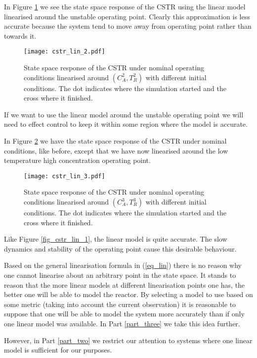 In Figure \ref{fig_cstr_lin_2} we see the state space response of the CSTR using the linear model linearised around the unstable operating point. Clearly this approximation is less accurate because the system tend to move away from operating point rather than towards it. 
\begin{figure}[H] 
\centering
\texttt{[image: cstr\_lin\_2.pdf]}
\caption{State space response of the CSTR under nominal operating conditions linearised around $(C_A^2,T_R^2)$ with different initial conditions. The dot indicates where the simulation started and the cross where it finished.}
\label{fig_cstr_lin_2}
\end{figure}
If we want to use the linear model around the unstable operating point we will need to effect control to keep it within some region where the model is accurate.

In Figure \ref{fig_cstr_lin_3} we have the state space response of the CSTR under nominal conditions, like before, except that we have now linearised around the low temperature high concentration operating point. 
\begin{figure}[H] 
\centering
\texttt{[image: cstr\_lin\_3.pdf]}
\caption{State space response of the CSTR under nominal operating conditions linearised around $(C_A^3,T_R^3)$ with different initial conditions. The dot indicates where the simulation started and the cross where it finished.}
\label{fig_cstr_lin_3}
\end{figure}
Like Figure \ref{fig_cstr_lin_1}, the linear model is quite accurate. The slow dynamics and stability of the operating point cause this desirable behaviour.

Based on the general linearisation formula in (\ref{eq_lin}) there is no reason why one cannot linearise about an arbitrary point in the state space. It stands to reason that the more linear models at different linearisation points one has, the better one will be able to model the reactor. By selecting a model to use based on some metric (taking into account the current observation) it is reasonable to suppose that one will be able to model the system more accurately than if only one linear model was available. In Part \ref{part_three} we take this idea further.

However, in Part \ref{part_two} we restrict our attention to systems where one linear model is sufficient for our purposes.  